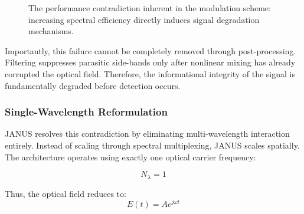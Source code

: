 \documentclass[journal]{IEEEtran}
\begin{document}
\begin{figure}[htbp]
\centering
{}
\caption{The performance contradiction inherent in the modulation scheme: increasing spectral efficiency directly induces signal degradation mechanisms.}
\label{fig:modulation_contradiction}
\end{figure}

Importantly, this failure cannot be completely removed through post-processing. Filtering suppresses parasitic side-bands only after nonlinear mixing has already corrupted the optical field. Therefore, the informational integrity of the signal is fundamentally degraded before detection occurs.

\subsubsection{\textbf{Single-Wavelength Reformulation}}

JANUS resolves this contradiction by eliminating multi-wavelength interaction entirely. Instead of scaling through spectral multiplexing, JANUS scales spatially. The architecture operates using exactly one optical carrier frequency:

\begin{equation}
N_{\lambda} = 1
\end{equation}

Thus, the optical field reduces to:
\begin{equation}
E(t) = Ae^{j\omega t}
\end{equation}
\end{document}
